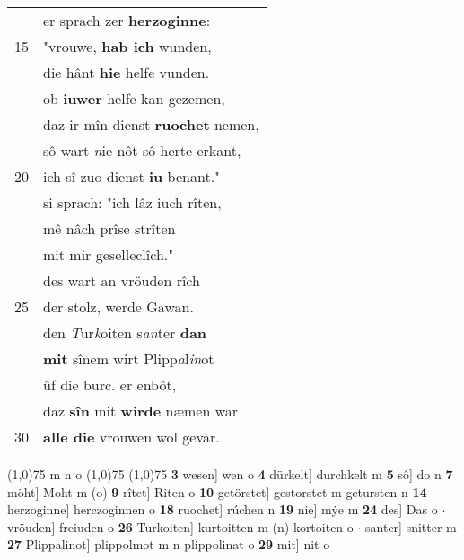 \documentclass[8pt,a4paper,notitlepage]{article}
\begin{document}
\begin{table}[ht]
\begin{minipage}[t]{0.5\linewidth}
\begin{tabular}{rl}
 & er sprach zer \textbf{herzoginne}:\\ 
15 & "vrouwe, \textbf{hab ich} wunden,\\ 
 & die hânt \textbf{hie} helfe vunden.\\ 
 & ob \textbf{iuwer} helfe kan gezemen,\\ 
 & daz ir mîn dienst \textbf{ruochet} nemen,\\ 
 & sô wart \textit{n}ie nôt sô herte erkant,\\ 
20 & ich sî zuo dienst \textbf{iu} benant."\\ 
 & si sprach: "ich lâz iuch rîten,\\ 
 & mê nâch prîse strîten\\ 
 & mit mir geselleclîch."\\ 
 & des wart an vröuden rîch\\ 
25 & der stolz, werde Gawan.\\ 
 & den \textit{T}ur\textit{k}oiten s\textit{an}ter \textbf{dan}\\ 
 & \textbf{mit} sînem wirt Plipp\textit{a}l\textit{in}ot\\ 
 & ûf die burc. er enbôt,\\ 
 & daz \textbf{sîn} mit \textbf{wirde} næmen war\\ 
30 & \textbf{alle die} vrouwen wol gevar.\\ 
\end{tabular}
\scriptsize
\line(1,0){75} \newline
m n o \newline
\line(1,0){75} \newline
\newline
\line(1,0){75} \newline
\textbf{3} wesen] wen o \textbf{4} dürkelt] durchkelt m \textbf{5} sô] do n \textbf{7} möht] Moht m (o) \textbf{9} rîtet] Riten o \textbf{10} getörstet] gestorstet m getursten n \textbf{14} herzoginne] herczoginnen o \textbf{18} ruochet] rúchen n \textbf{19} nie] mẏe m \textbf{24} des] Das o  $\cdot$ vröuden] freiuden o \textbf{26} Turkoiten] kurtoitten m (n) kortoiten o  $\cdot$ santer] snitter m \textbf{27} Plippalinot] plippolmot m n plippolinat o \textbf{29} mit] nit o \newline
\end{minipage}
\end{table}
\newpage
\end{document}
